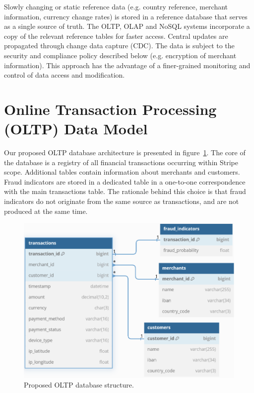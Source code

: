 \documentclass[11pt,a4paper,computermodern]{article}
\begin{document}
Slowly changing or static reference data (e.g. country reference, merchant information, currency change rates) is stored in a reference database that serves as a single source of truth. The OLTP, OLAP and NoSQL systems incorporate a copy of the relevant reference tables for faster access. Central updates are propagated through change data capture (CDC). The data is subject to the security and compliance policy described below (e.g. encryption of merchant information). This approach has the advantage of a finer-grained monitoring and control of data access and modification.


\section*{Online Transaction Processing (OLTP) Data Model}

Our proposed OLTP database architecture is presented in figure~\ref{fig:OLTP}. The core of the database is a registry of all financial transactions occurring within Stripe scope. Additional tables contain information about merchants and customers. Fraud indicators are stored in a dedicated table in a one-to-one correspondence with the main transactions table. The rationale behind this choice is that fraud indicators do not originate from the same source as transactions, and are not produced at the same time.


\begin{figure}
	\centering
	\includegraphics[scale=0.7]{./figures/OLTP}
	\caption{Proposed OLTP database structure.}
	\label{fig:OLTP}
\end{figure}
\end{document}
